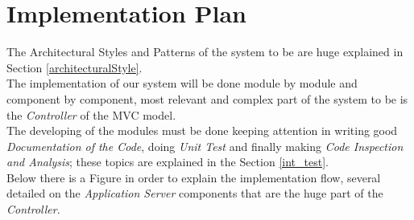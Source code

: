 \section{Implementation Plan}
The Architectural Styles and Patterns of the system to be are huge explained in Section \ref{architecturalStyle}.\\
The implementation of our system will be done module by module and component by component, most relevant and complex part of the system to be is the \textit{Controller} of the MVC model.\\
The developing of the modules must be done keeping attention in writing good \textit{Documentation of the Code}, doing \textit{Unit Test} and
finally making \textit{Code Inspection and Analysis}; these topics are explained in the Section \ref{int_test}.\\
Below there is a Figure in order to explain the implementation flow, several detailed on the \textit{Application Server} components that are the huge part of the \textit{Controller}.

